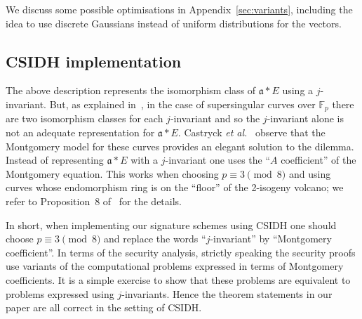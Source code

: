\documentclass{llncs}
\newcommand{\F}{\mathbb{F}}
\renewcommand{\a}{\mathfrak{a}}
\begin{document}
We discuss some possible optimisations in Appendix~\ref{sec:variants}, including the idea to use discrete Gaussians instead of uniform distributions for the vectors.


%
%
%



\subsection{CSIDH implementation} \label{sec:CSIDH-implementation}

The above description represents the isomorphism class of $\a * E$ using a $j$-invariant.
But, as explained in~\cite{DG16,CLMPR18}, in the case of supersingular curves over $\F_p$ there are two isomorphism classes for each $j$-invariant and so the $j$-invariant alone is not an adequate representation for $\a * E$.
Castryck \emph{et al.}~\cite{CLMPR18} observe that the Montgomery model for these curves provides an elegant solution to the dilemma.
Instead of representing $\a * E$ with a $j$-invariant one uses the ``$A$ coefficient'' of the Montgomery equation.
This works when choosing $p \equiv 3 \pmod{8}$ and using curves whose endomorphism ring is on the ``floor'' of the 2-isogeny volcano; we refer to Proposition~8 of~\cite{CLMPR18} for the details. 

In short, when implementing our signature schemes using CSIDH one should choose $p \equiv 3 \pmod{8}$ and replace the words ``$j$-invariant'' by ``Montgomery coefficient''.
In terms of the security analysis, strictly speaking the security proofs use variants of the computational problems expressed in terms of Montgomery coefficients.
It is a simple exercise to show that these problems are equivalent to problems expressed using $j$-invariants.
Hence the theorem statements in our paper are all correct in the setting of CSIDH.
\end{document}
